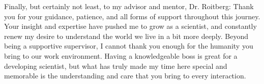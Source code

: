 Finally, but certainly not least, to my advisor and mentor, Dr. Roitberg: Thank you for your guidance, patience, and all forms of support throughout this journey.
Your insight and expertise have pushed me to grow as a scientist, and constantly renew my desire to understand the world we live in a bit more deeply. 
Beyond being a supportive supervisor, I cannot thank you enough for the humanity you bring to our work environment. 
Having a knowledgeable boss is great for a developing scientist, but what has truly made my time here special and memorable is the understanding and care that you bring to every interaction. 
